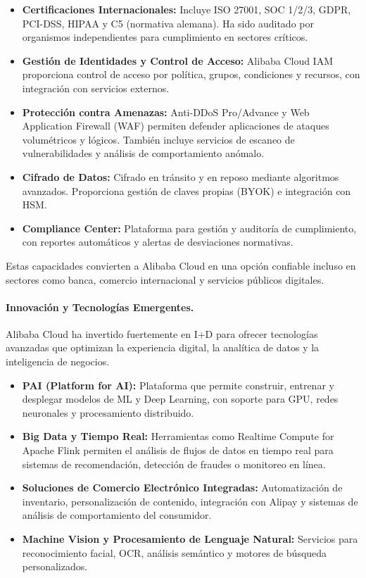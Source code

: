 {                \begin{itemize}
                    \item \textbf{Certificaciones Internacionales:} Incluye ISO 27001, SOC 1/2/3, GDPR, PCI-DSS, HIPAA y C5 (normativa alemana). Ha sido auditado por organismos independientes para cumplimiento en sectores críticos.
                    \item \textbf{Gestión de Identidades y Control de Acceso:} Alibaba Cloud IAM proporciona control de acceso por política, grupos, condiciones y recursos, con integración con servicios externos.
                    \item \textbf{Protección contra Amenazas:} Anti-DDoS Pro/Advance y Web Application Firewall (WAF) permiten defender aplicaciones de ataques volumétricos y lógicos. También incluye servicios de escaneo de vulnerabilidades y análisis de comportamiento anómalo.
                    \item \textbf{Cifrado de Datos:} Cifrado en tránsito y en reposo mediante algoritmos avanzados. Proporciona gestión de claves propias (BYOK) e integración con HSM.
                    \item \textbf{Compliance Center:} Plataforma para gestión y auditoría de cumplimiento, con reportes automáticos y alertas de desviaciones normativas.
                \end{itemize}
                
                Estas capacidades convierten a Alibaba Cloud en una opción confiable incluso en sectores como banca, comercio internacional y servicios públicos digitales.
                
                \paragraph{Innovación y Tecnologías Emergentes.}
                Alibaba Cloud ha invertido fuertemente en I+D para ofrecer tecnologías avanzadas que optimizan la experiencia digital, la analítica de datos y la inteligencia de negocios.
                
                \begin{itemize}
                    \item \textbf{PAI (Platform for AI):} Plataforma que permite construir, entrenar y desplegar modelos de ML y Deep Learning, con soporte para GPU, redes neuronales y procesamiento distribuido.
                    \item \textbf{Big Data y Tiempo Real:} Herramientas como Realtime Compute for Apache Flink permiten el análisis de flujos de datos en tiempo real para sistemas de recomendación, detección de fraudes o monitoreo en línea.
                    \item \textbf{Soluciones de Comercio Electrónico Integradas:} Automatización de inventario, personalización de contenido, integración con Alipay y sistemas de análisis de comportamiento del consumidor.
                    \item \textbf{Machine Vision y Procesamiento de Lenguaje Natural:} Servicios para reconocimiento facial, OCR, análisis semántico y motores de búsqueda personalizados.
                \end{itemize}
                
}
